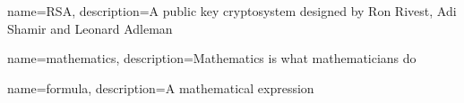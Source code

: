{
    name=RSA,
    description={A public key cryptosystem designed by Ron Rivest, Adi Shamir and Leonard Adleman}
}

{
    name=mathematics,
    description={Mathematics is what mathematicians do}
}

{
    name=formula,
    description={A mathematical expression}
}


